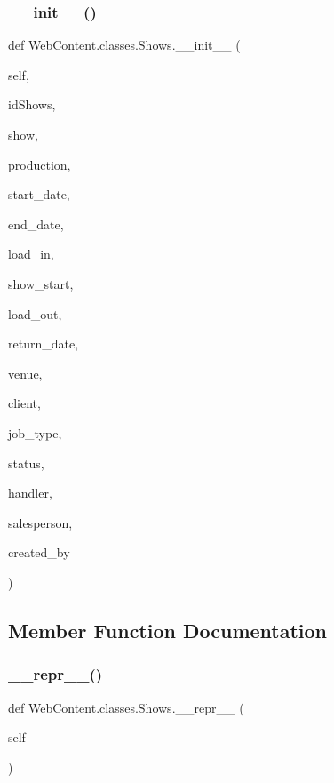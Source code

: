 \subsubsection{\texorpdfstring{\+\_\+\+\_\+init\+\_\+\+\_\+()}{\_\_init\_\_()}}
{\footnotesize\ttfamily def Web\+Content.\+classes.\+Shows.\+\_\+\+\_\+init\+\_\+\+\_\+ (\begin{DoxyParamCaption}\item[{}]{self,  }\item[{}]{id\+Shows,  }\item[{}]{show,  }\item[{}]{production,  }\item[{}]{start\+\_\+date,  }\item[{}]{end\+\_\+date,  }\item[{}]{load\+\_\+in,  }\item[{}]{show\+\_\+start,  }\item[{}]{load\+\_\+out,  }\item[{}]{return\+\_\+date,  }\item[{}]{venue,  }\item[{}]{client,  }\item[{}]{job\+\_\+type,  }\item[{}]{status,  }\item[{}]{handler,  }\item[{}]{salesperson,  }\item[{}]{created\+\_\+by }\end{DoxyParamCaption})}



\subsection{Member Function Documentation}
\mbox{\label{class_web_content_1_1classes_1_1_shows_a6691b87ec53fa9349d04a41317fd1bee}} 
\subsubsection{\texorpdfstring{\+\_\+\+\_\+repr\+\_\+\+\_\+()}{\_\_repr\_\_()}}
{\footnotesize\ttfamily def Web\+Content.\+classes.\+Shows.\+\_\+\+\_\+repr\+\_\+\+\_\+ (\begin{DoxyParamCaption}\item[{}]{self }\end{DoxyParamCaption})}



